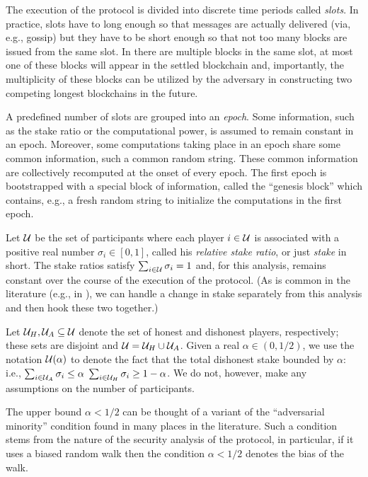 

The execution of the protocol is divided into discrete time periods called \emph{slots}. 
In practice, slots have to long enough so that 
messages are actually delivered (via, e.g., gossip) 
but they have to be short enough so that 
not too many blocks are issued from the same slot.
In there are multiple blocks in the same slot, 
at most one of these blocks will appear in the settled blockchain 
and, importantly, 
the multiplicity of these blocks can be utilized by the adversary 
in constructing two competing longest blockchains in the future.

A predefined number of slots are grouped into an \emph{epoch}. 
Some information, such as the stake ratio or the computational power, 
is assumed to remain constant in an epoch. 
Moreover, some computations taking place in an epoch 
share some common information, such a common random string. 
These common information are collectively recomputed 
at the onset of every epoch. 
The first epoch is bootstrapped with a special block of information, 
called the ``genesis block'' which contains, e.g., a fresh random string to 
initialize the computations in the first epoch.



Let
$\mathcal{U}$ be the set of participants 
where each player $i \in \mathcal{U}$ is associated with a positive real number 
$\sigma_i \in [0,1]$, called his \emph{relative stake ratio}, or just \emph{stake} in short. 
The stake ratios satisfy $\sum_{i \in \mathcal{U}} \sigma_i = 1$ 
and, for this analysis, remains constant over the course of the execution of the protocol. 
(As is common in the literature (e.g., in \cite{Ouroboros,Praos,SnowWhite}), 
we can handle a change in stake separately from this analysis and then hook these two together.)

Let $\mathcal{U}_H, \mathcal{U}_A \subseteq \mathcal{U}$ 
denote the set of honest and dishonest players, respectively;
these sets are disjoint and $\mathcal{U} = \mathcal{U}_H \cup \mathcal{U}_A$.
Given a real $\alpha \in (0,1/2)$, 
we use the notation $\mathcal{U}(\alpha)$ 
to denote the fact that the total dishonest stake bounded by $\alpha$: i.e., 
$\sum_{i \in \mathcal{U}_A} \sigma_i \leq \alpha$
$\sum_{i \in \mathcal{U}_H} \sigma_i \geq 1 - \alpha$. 
We do not, however, make any assumptions on the number of participants.

The upper bound $\alpha < 1/2$ can be thought of a variant of the ``adversarial minority'' condition 
found in many places in the literature. 
Such a condition stems from the nature of the security analysis of the protocol, 
in particular, if it uses a biased random walk then the condition $\alpha < 1/2$ denotes the bias of the walk.



